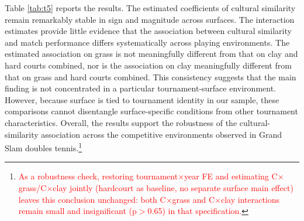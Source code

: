 \documentclass[10pt]{article}
\begin{document}
Table \ref{tab:t5} reports the results. The estimated coefficients of cultural similarity remain remarkably stable in sign and magnitude across surfaces. The interaction estimates provide little evidence that the association between cultural similarity and match performance differs systematically across playing environments. The estimated association on grass is not meaningfully different from that on clay and hard courts combined, nor is the association on clay meaningfully different from that on grass and hard courts combined. This consistency suggests that the main finding is not concentrated in a particular tournament-surface environment. However, because surface is tied to tournament identity in our sample, these comparisons cannot disentangle surface-specific conditions from other tournament characteristics. Overall, the results support the robustness of the cultural-similarity association across the competitive environments observed in Grand Slam doubles tennis.\footnote{\textcolor{red}{As a robustness check, restoring tournament$\times$year FE and estimating C$\times$grass/C$\times$clay jointly (hardcourt as baseline, no separate surface main effect) leaves this conclusion unchanged: both C$\times$grass and C$\times$clay interactions remain small and insignificant (p$>$0.65) in that specification.}} 
\end{document}
